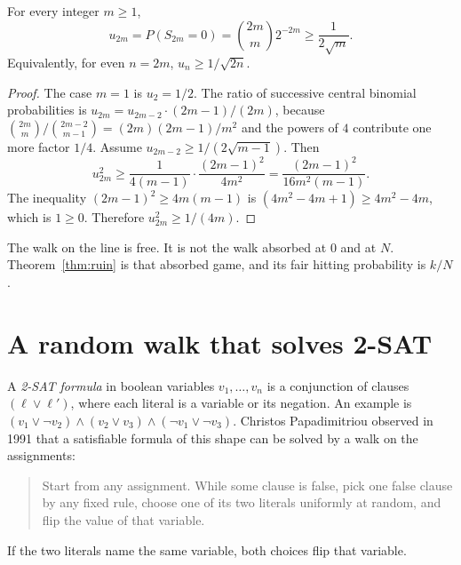 \begin{lemma}\label{lem:centralbin}
For every integer $m\ge 1$,
\[
 u_{2m}=P(S_{2m}=0)=\binom{2m}{m}2^{-2m}\ge\frac1{2\sqrt m}.
\]
Equivalently, for even $n=2m$, $u_n\ge 1/\sqrt{2n}$.
\end{lemma}
\begin{proof}
The case $m=1$ is $u_2=1/2$. The ratio of successive central binomial probabilities is $u_{2m}=u_{2m-2}\cdot(2m-1)/(2m)$, because $\binom{2m}{m}/\binom{2m-2}{m-1}=(2m)(2m-1)/m^2$ and the powers of $4$ contribute one more factor $1/4$. Assume $u_{2m-2}\ge 1/(2\sqrt{m-1})$. Then
\[
 u_{2m}^2\ge\frac1{4(m-1)}\cdot\frac{(2m-1)^2}{4m^2}=\frac{(2m-1)^2}{16 m^2(m-1)}.
\]
The inequality $(2m-1)^2\ge 4m(m-1)$ is $(4m^2-4m+1)\ge 4m^2-4m$, which is $1\ge 0$. Therefore $u_{2m}^2\ge 1/(4m)$.
\end{proof}

The walk on the line is free. It is not the walk absorbed at $0$ and at $N$. Theorem~\ref{thm:ruin} is that absorbed game, and its fair hitting probability is $k/N$.

\section{A random walk that solves 2-SAT}

A \emph{2-SAT formula} in boolean variables $v_1,\ldots,v_n$ is a conjunction of clauses $(\ell\vee\ell')$, where each literal is a variable or its negation. An example is $(v_1\vee\neg v_2)\wedge(v_2\vee v_3)\wedge(\neg v_1\vee\neg v_3)$. Christos Papadimitriou observed in 1991 that a satisfiable formula of this shape can be solved by a walk on the assignments:

\begin{quote}
Start from any assignment. While some clause is false, pick one false clause by any fixed rule, choose one of its two literals uniformly at random, and flip the value of that variable.
\end{quote}

If the two literals name the same variable, both choices flip that variable.

